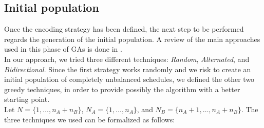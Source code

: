 \documentclass[opre,nonblindrev]{informs3} %
\begin{document}
\subsection{Initial population}
Once the encoding strategy has been defined, the next step to be performed regards the generation of the initial population. A review of the main approaches used in this phase of GAs is done in \cite{init1}.\\
In our approach, we tried three different techniques: \textit{Random}, \textit{Alternated}, and \textit{Bidirectional}. Since the first strategy works randomly and we risk to create an initial population of completely unbalanced schedules, we defined the other two greedy techniques, in order to provide possibly the algorithm with a better starting point.\\
Let $N = \{1,\ldots,n_A+n_B\}$, $N_A =\{1,\ldots,n_A\}$, and $N_B=\{n_A+1,\ldots,n_A+n_B\}$. The three techniques we used can be formalized as follows:
\end{document}

